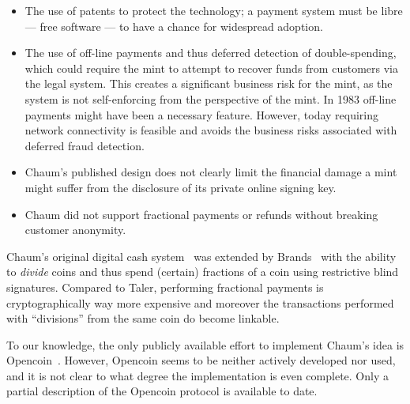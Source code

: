 \documentclass{llncs}
\begin{document}
\begin{itemize}
 \item The use of patents to protect the technology; a payment system
   must be libre --- free software --- to have a chance for widespread
   adoption.
 \item The use of off-line payments and thus deferred detection of
   double-spending, which could require the mint to attempt to recover
   funds from customers via the legal system.  This creates a
   significant business risk for the mint, as the system is not
   self-enforcing from the perspective of the mint.  In 1983 off-line
   payments might have been a necessary feature.  However, today
   requiring network connectivity is feasible and avoids the business
   risks associated with deferred fraud detection.
 \item %
   Chaum's published design does not clearly
   limit the financial damage a mint might suffer from the
   disclosure of its private online signing key.
 \item Chaum did not support fractional payments or refunds without
   breaking customer anonymity.
\end{itemize}

Chaum's original digital cash system~\cite{chaum1983blind} was
extended by Brands~\cite{brands1993efficient} with the ability to {\em
  divide} coins and thus spend (certain) fractions of a coin using
restrictive blind signatures.  Compared to Taler, performing
fractional payments is cryptographically way more expensive and
moreover the transactions performed with ``divisions'' from the same
coin do become linkable.
%
%

To our knowledge, the only publicly available effort to implement
Chaum's idea is Opencoin~\cite{dent2008extensions}.  However, Opencoin
seems to be neither actively developed nor used, and it is not clear
to what degree the implementation is even complete.  Only a partial
description of the Opencoin protocol is available to date.
\end{document}
